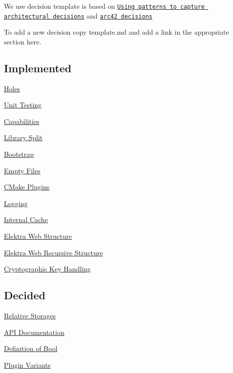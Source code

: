 We use decision template is based on \href{http://www.cs.rug.nl/~paris/papers/IEEESW07.pdf}{\tt Using patterns to capture architectural decisions} and \href{http://confluence.arc42.org/display/templateEN/9.+Design+Decisions}{\tt arc42 decisions}

To add a new decision copy template.\+md and add a link in the appropriate section here.

\subsection*{Implemented}


\begin{DoxyItemize}
\item \hyperlink{doc_decisions_holes_md}{Holes}
\item \hyperlink{doc_decisions_unit_testing_md}{Unit Testing}
\item \hyperlink{doc_decisions_capabilities_md}{Capabilities}
\item \hyperlink{doc_decisions_library_split_md}{Library Split}
\item \hyperlink{doc_decisions_bootstrap_md}{Bootstrap}
\item \hyperlink{doc_decisions_empty_files_md}{Empty Files}
\item \hyperlink{doc_decisions_cmake_plugins_md}{C\+Make Plugins}
\item \hyperlink{doc_decisions_logging_md}{Logging}
\item \hyperlink{doc_decisions_internal_cache_md}{Internal Cache}
\item \hyperlink{doc_decisions_elektra_web_md}{Elektra Web Structure}
\item \hyperlink{doc_decisions_elektra_web_recursive_md}{Elektra Web Recursive Structure}
\item \hyperlink{doc_decisions_cryptograhic_key_handling_md}{Cryptographic Key Handling}
\end{DoxyItemize}

\subsection*{Decided}


\begin{DoxyItemize}
\item \hyperlink{doc_decisions_relative_md}{Relative Storages}
\item \hyperlink{doc_decisions_api_documentation_md}{A\+PI Documentation}
\item \hyperlink{doc_decisions_bool_md}{Definition of Bool}
\item \hyperlink{doc_decisions_plugin_variants_md}{Plugin Variants}
\end{DoxyItemize}

